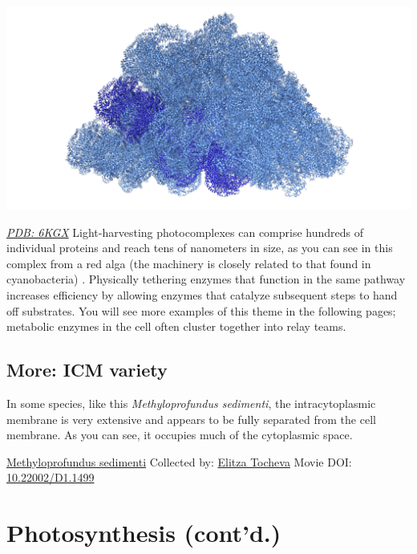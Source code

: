 \documentclass[]{tufte-book}
\begin{document}
\includegraphics{img/schematics/4_3_1}

\href{http://rcsb.org/structure/6KGX}{\emph{PDB: 6KGX}}
Light-harvesting photocomplexes can comprise hundreds of individual proteins and reach tens of nanometers in size, as you can see in this complex from a red alga (the machinery is closely related to that found in cyanobacteria) \citep{ma2020}. Physically tethering enzymes that function in the same pathway increases efficiency by allowing enzymes that catalyze subsequent steps to hand off substrates. You will see more examples of this theme in the following pages; metabolic enzymes in the cell often cluster together into relay teams.

\hypertarget{ICM_variety}{%
\subsection*{More: ICM variety}\label{ICM_variety}}

In some species, like this \emph{Methyloprofundus sedimenti}, the intracytoplasmic membrane is very extensive and appears to be fully separated from the cell membrane. As you can see, it occupies much of the cytoplasmic space.



\hypertarget{htmlwidget-a5d0db049214ae3b61a8}{}

\label{fig:4-3a}\protect\hyperlink{tree}{Methyloprofundus sedimenti} Collected by: \protect\hyperlink{elitza_tocheva}{Elitza Tocheva} Movie DOI: \href{https://doi.org/10.22002/D1.1499}{10.22002/D1.1499}

\hypertarget{photosynthesis-contd.}{%
\section{Photosynthesis (cont'd.)}\label{photosynthesis-contd.}}
\end{document}
